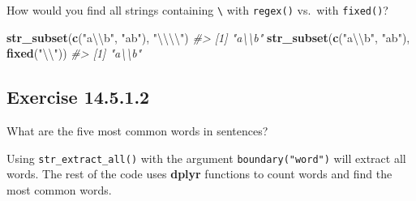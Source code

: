 \documentclass[]{book}
\newenvironment{Shaded}{\begin{snugshade}}{\end{snugshade}}
\newcommand{\CharTok}[1]{\textcolor[rgb]{0.31,0.60,0.02}{#1}}
\newcommand{\CommentTok}[1]{\textcolor[rgb]{0.56,0.35,0.01}{\textit{#1}}}
\newcommand{\DataTypeTok}[1]{\textcolor[rgb]{0.13,0.29,0.53}{#1}}
\newcommand{\DecValTok}[1]{\textcolor[rgb]{0.00,0.00,0.81}{#1}}
\newcommand{\KeywordTok}[1]{\textcolor[rgb]{0.13,0.29,0.53}{\textbf{#1}}}
\newcommand{\NormalTok}[1]{#1}
\newcommand{\OperatorTok}[1]{\textcolor[rgb]{0.81,0.36,0.00}{\textbf{#1}}}
\newcommand{\OtherTok}[1]{\textcolor[rgb]{0.56,0.35,0.01}{#1}}
\newcommand{\StringTok}[1]{\textcolor[rgb]{0.31,0.60,0.02}{#1}}
\theoremstyle{plain}
\theoremstyle{remark}
\begin{document}
How would you find all strings containing \texttt{\textbackslash{}} with
\texttt{regex()} vs.~with \texttt{fixed()}?

\begin{Shaded}
\begin{Highlighting}[]
\KeywordTok{str_subset}\NormalTok{(}\KeywordTok{c}\NormalTok{(}\StringTok{"a}\CharTok{\textbackslash{}\textbackslash{}}\StringTok{b"}\NormalTok{, }\StringTok{"ab"}\NormalTok{), }\StringTok{"}\CharTok{\textbackslash{}\textbackslash{}\textbackslash{}\textbackslash{}}\StringTok{"}\NormalTok{)}
\CommentTok{#> [1] "a\textbackslash{}\textbackslash{}b"}
\KeywordTok{str_subset}\NormalTok{(}\KeywordTok{c}\NormalTok{(}\StringTok{"a}\CharTok{\textbackslash{}\textbackslash{}}\StringTok{b"}\NormalTok{, }\StringTok{"ab"}\NormalTok{), }\KeywordTok{fixed}\NormalTok{(}\StringTok{"}\CharTok{\textbackslash{}\textbackslash{}}\StringTok{"}\NormalTok{))}
\CommentTok{#> [1] "a\textbackslash{}\textbackslash{}b"}
\end{Highlighting}
\end{Shaded}

\hypertarget{exercise-14.5.1.2}{%
\subsection*{\texorpdfstring{Exercise
{14.5.1.2}}{Exercise 14.5.1.2}}\label{exercise-14.5.1.2}}

What are the five most common words in sentences?

Using \texttt{str\_extract\_all()} with the argument
\texttt{boundary("word")} will extract all words. The rest of the code
uses \textbf{dplyr} functions to count words and find the most common
words.

\begin{Shaded}
\end{Shaded}
\end{document}
